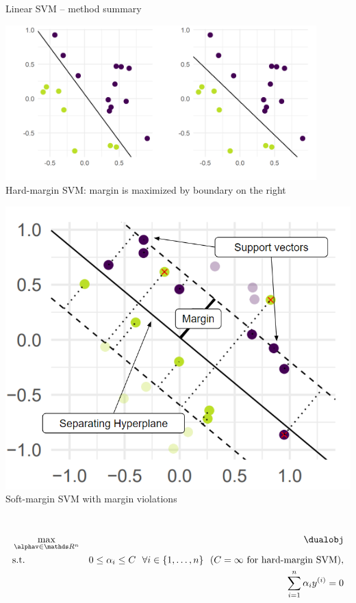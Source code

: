 \begin{vbframe}{Linear SVM -- method summary}
\medskip
\footnotesize
\begin{minipage}{0.6\textwidth}
  \centering
  \includegraphics[width=0.9\textwidth]{
  ../slides/linear-svm/figure/linear_classif_1.png}  \\
  \tiny{Hard-margin SVM: margin is maximized by boundary on the right}
\end{minipage}
\hfill
\begin{minipage}{0.3\textwidth}
  \centering
  \includegraphics[width=1.1\textwidth]{figure/svm_wording.png} \\
  \tiny{Soft-margin SVM with margin violations}
\end{minipage}

\medskip

 ~~ %
\begin{eqnarray*}
    & \max\limits_{\alphav \in \R^n} & \dualobj \\
    & \text{s.t. } & 0 \le \alpha_i \le C ~~ \forall i \in \nset ~~ (C = \infty
    \text{ for hard-margin SVM)}, \\
    & \quad & \sum_{i=1}^n \alpha_i \yi = 0
\end{eqnarray*}


\end{vbframe}
